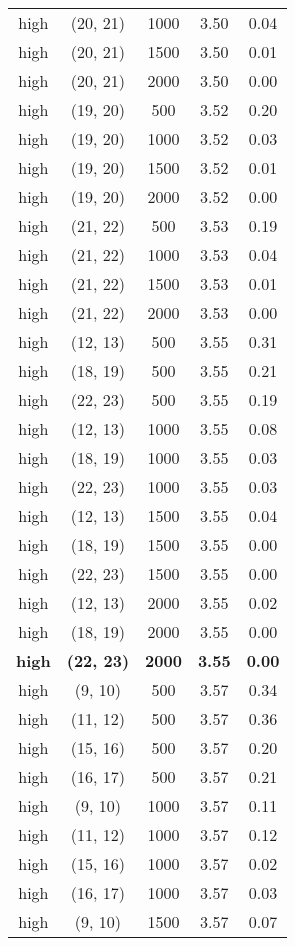 \begin{tabular}{c c c c c}
high & (20, 21) &  1000 & 3.50 & 0.04 \\
high & (20, 21) &  1500 & 3.50 & 0.01 \\
high & (20, 21) &  2000 & 3.50 & 0.00 \\
high & (19, 20) &  500 & 3.52 & 0.20 \\
high & (19, 20) &  1000 & 3.52 & 0.03 \\
high & (19, 20) &  1500 & 3.52 & 0.01 \\
high & (19, 20) &  2000 & 3.52 & 0.00 \\
high & (21, 22) &  500 & 3.53 & 0.19 \\
high & (21, 22) &  1000 & 3.53 & 0.04 \\
high & (21, 22) &  1500 & 3.53 & 0.01 \\
high & (21, 22) &  2000 & 3.53 & 0.00 \\
high & (12, 13) &  500 & 3.55 & 0.31 \\
high & (18, 19) &  500 & 3.55 & 0.21 \\
high & (22, 23) &  500 & 3.55 & 0.19 \\
high & (12, 13) &  1000 & 3.55 & 0.08 \\
high & (18, 19) &  1000 & 3.55 & 0.03 \\
high & (22, 23) &  1000 & 3.55 & 0.03 \\
high & (12, 13) &  1500 & 3.55 & 0.04 \\
high & (18, 19) &  1500 & 3.55 & 0.00 \\
high & (22, 23) &  1500 & 3.55 & 0.00 \\
high & (12, 13) &  2000 & 3.55 & 0.02 \\
high & (18, 19) &  2000 & 3.55 & 0.00 \\
\textbf{high} & \textbf{(22, 23)} & \textbf{ 2000} & \textbf{3.55} & \textbf{0.00} \\
high & (9, 10) &  500 & 3.57 & 0.34 \\
high & (11, 12) &  500 & 3.57 & 0.36 \\
high & (15, 16) &  500 & 3.57 & 0.20 \\
high & (16, 17) &  500 & 3.57 & 0.21 \\
high & (9, 10) &  1000 & 3.57 & 0.11 \\
high & (11, 12) &  1000 & 3.57 & 0.12 \\
high & (15, 16) &  1000 & 3.57 & 0.02 \\
high & (16, 17) &  1000 & 3.57 & 0.03 \\
high & (9, 10) &  1500 & 3.57 & 0.07 \\

\end{tabular}
